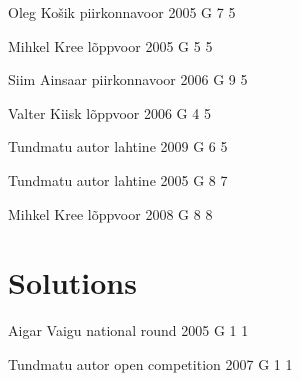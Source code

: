 \documentclass[11pt]{article}
\begin{document}
{Oleg Košik} %
{piirkonnavoor} %
{2005} %
{G 7} %
{5} %
{

\ifEngHint
\fi
}

{Mihkel Kree} %
{lõppvoor} %
{2005} %
{G 5} %
{5} %
{

\ifEngHint
\fi
}

{Siim Ainsaar} %
{piirkonnavoor} %
{2006} %
{G 9} %
{5} %
{

\ifEngHint
\fi
}

{Valter Kiisk} %
{lõppvoor} %
{2006} %
{G 4} %
{5} %
{

\ifEngHint
\fi
}

{Tundmatu autor} %
{lahtine} %
{2009} %
{G 6} %
{5} %
{

\ifEngHint
\fi
}

{Tundmatu autor} %
{lahtine} %
{2005} %
{G 8} %
{7} %
{

\ifEngHint
\fi
}

{Mihkel Kree} %
{lõppvoor} %
{2008} %
{G 8} %
{8} %
{

\ifEngHint
\fi
}
\newpage\section{Solutions}
        \ToggleEngSolution
        
\ylDisplay{} %
{Aigar Vaigu} %
{national round} %
{2005} %
{G 1} %
{1} %
{

\ifEngSolution
\fi
}

\ylDisplay{} %
{Tundmatu autor} %
{open competition} %
{2007} %
{G 1} %
{1} %
{

\ifEngSolution
\fi
}
\end{document}
